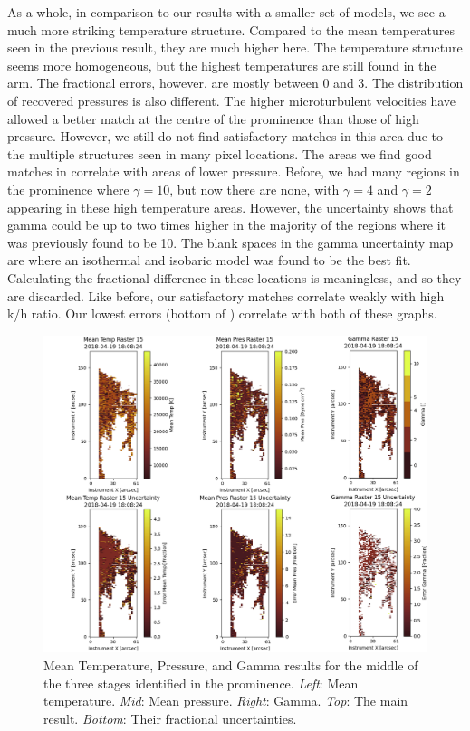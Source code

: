 As a whole, in comparison to our results with a smaller set of models, we see a much more striking temperature structure. Compared to the mean temperatures seen in the previous result, they are much higher here. The temperature structure seems more homogeneous, but the highest temperatures are still found in the arm.
The fractional errors, however, are mostly between 0 and 3. The distribution of recovered pressures is also different. The higher microturbulent velocities have allowed a better match at the centre of the prominence than those of high pressure. However, we still do not find satisfactory matches in this area due to the multiple structures seen in many pixel locations. The areas we find good matches in correlate with areas of lower pressure. Before, we had many regions in the prominence where $\gamma=10$, but now there are none, with $\gamma=4$ and $\gamma=2$ appearing in these high temperature areas. However, the uncertainty shows that gamma could be up to two times higher in the majority of the regions where it was previously found to be 10. The blank spaces in the gamma uncertainty map are where an isothermal and isobaric model was found to be the best fit. Calculating the fractional difference in these locations is meaningless, and so they are discarded. Like before, our satisfactory matches correlate weakly with high k/h ratio. Our lowest errors (bottom of ) correlate with both of these graphs. 

\begin{figure} 
    \centering
    \includegraphics*[width=\linewidth]{./02Modelling1D/20180419r/fullfig.png}
    \caption[Mean Temperature, Pressure, and Gamma Results from xRMS for the prominence of 2018 04 19]{Mean Temperature, Pressure, and Gamma results for the middle of the three stages identified in the prominence. \textit{Left}: Mean temperature. \textit{Mid}: Mean pressure. \textit{Right}: Gamma. \textit{Top}: The main result. \textit{Bottom}: Their fractional uncertainties.}
    \label{20180419rresults}
\end{figure}

